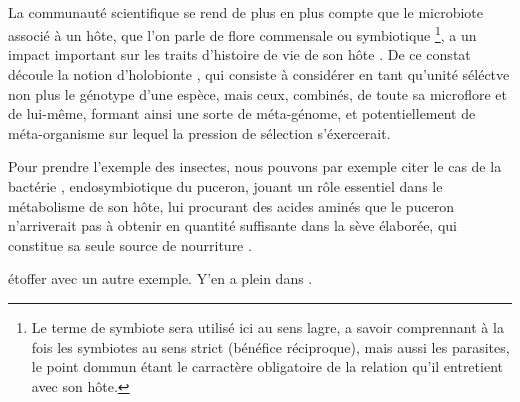 
\paragraph{} %
\label{par:intro1}

La communauté scientifique se rend de plus en plus compte que le microbiote
associé à un hôte, que l'on parle de flore commensale ou symbiotique
\footnote{Le terme de symbiote sera utilisé ici au sens lagre, a savoir
comprennant à la fois les symbiotes au sens strict (bénéfice réciproque), mais
aussi les parasites, le point dommun étant le carractère obligatoire de la
relation qu'il entretient avec son hôte.}, a un impact important sur les
traits d'histoire de vie de son hôte \cite{feldhaar2011}. De ce constat
découle la notion d'holobionte \cite{rosenberg2007}, qui consiste à considérer
en tant qu'unité séléctve non plus le génotype d'une espèce, mais ceux,
combinés, de toute sa microflore et de lui-même, formant ainsi une sorte de
méta-génome, et potentiellement de méta-organisme sur lequel la pression de
sélection s'éxercerait.

Pour prendre l'exemple des insectes, nous pouvons par exemple citer le cas de
la bactérie ,  endosymbiotique du puceron, jouant un rôle
essentiel dans le métabolisme de son hôte, lui procurant des acides aminés que
le puceron n'arriverait pas à obtenir en quantité suffisante dans la sève
élaborée, qui constitue sa seule source de nourriture \cite{douglas1998}.

\begin{note}
étoffer avec un autre exemple. Y'en a plein dans \cite{feldhaar2011}.
\end{note}



